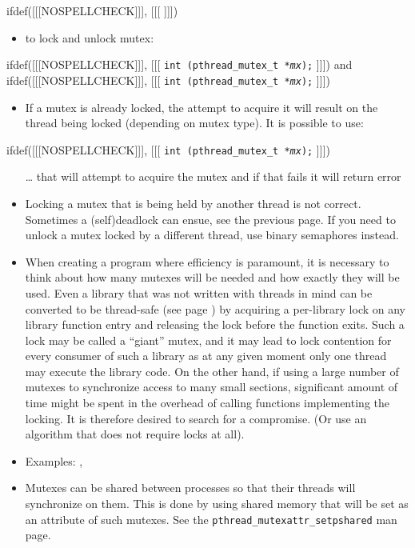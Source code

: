 ifdef([[[NOSPELLCHECK]]], [[[
]]])

\begin{slide}

\begin{itemize}
\item to lock and unlock mutex:
\end{itemize}
ifdef([[[NOSPELLCHECK]]], [[[
\texttt{int (pthread\_mutex\_t *\emph{mx});}
]]])
and
ifdef([[[NOSPELLCHECK]]], [[[
\texttt{int (pthread\_mutex\_t *\emph{mx});}
]]])
\begin{itemize}
\item If a mutex is already locked, the attempt to acquire it will result on the
thread being locked (depending on mutex type).
It is possible to use:
\end{itemize}
ifdef([[[NOSPELLCHECK]]], [[[
\texttt{int (pthread\_mutex\_t *\emph{mx});}
]]])
\begin{itemize}
\item[\dots] that will attempt to acquire the mutex and if that fails it will
return error
\end{itemize}
\end{slide}

\label{MUTEXES2}

\begin{itemize}
\item Locking a mutex that is being held by another thread is not correct.
Sometimes a (self)deadlock can ensue, see the previous page. If you need to
unlock a mutex locked by a different thread, use binary semaphores instead.
\item When creating a program where efficiency is paramount, it is necessary to
think about how many mutexes will be needed and how exactly they will be used.
Even a library that was not written with threads in mind can be converted to be
thread-safe (see page \pageref{THREADSAFE}) by acquiring a per-library lock on
any library function entry and releasing the lock before the function exits.
Such a lock may be called a ``giant'' mutex, and it may lead to lock contention
for every consumer of such a library as at any given moment only one thread may
execute the library code.  On the other hand, if using a large number of mutexes
to synchronize access to many small sections, significant amount of time might
be spent in the overhead of calling functions implementing the locking.  It is
therefore desired to search for a compromise.  (Or use an algorithm that does
not require locks at all).
\item \label{MUTEX_RACE} Examples: ,
\item Mutexes can be shared between processes so that their threads will
synchronize on them. This is done by using shared memory that will be set as an
attribute of such mutexes. See the
\texttt{pthread\_mutexattr\_setpshared} man page.
\end{itemize}


